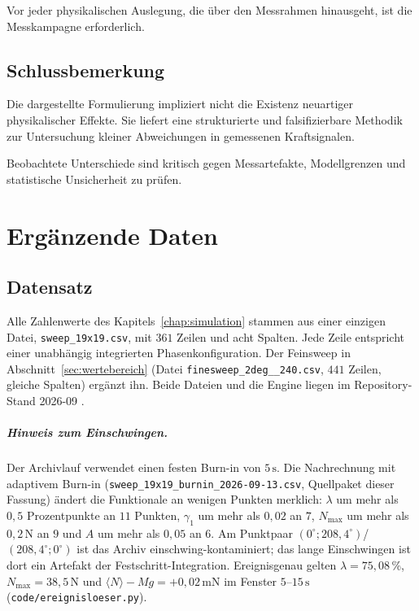 \documentclass[12pt,a4paper]{report}
\begin{document}
Vor jeder physikalischen Auslegung, die über den Messrahmen hinausgeht,
ist die Messkampagne erforderlich.

\section{Schlussbemerkung}

Die dargestellte Formulierung impliziert nicht die Existenz neuartiger
physikalischer Effekte. Sie liefert eine strukturierte und
falsifizierbare Methodik zur Untersuchung kleiner Abweichungen in
gemessenen Kraftsignalen.

Beobachtete Unterschiede sind kritisch gegen Messartefakte,
Modellgrenzen und statistische Unsicherheit zu prüfen.


\appendix

\chapter{Ergänzende Daten}
\label{app:daten}

\section{Datensatz}
\label{sec:anh-datensatz}

Alle Zahlenwerte des Kapitels~\ref{chap:simulation} stammen aus einer
einzigen Datei, \texttt{sweep\_19x19.csv}, mit $361$ Zeilen und acht
Spalten. Jede Zeile entspricht einer unabhängig integrierten
Phasenkonfiguration. Der Feinsweep in Abschnitt~\ref{sec:wertebereich}
(Datei \texttt{finesweep\_\allowbreak 2deg\_\_\allowbreak 240.csv}, $441$ Zeilen, gleiche
Spalten) ergänzt ihn. Beide Dateien und die Engine liegen im
Repository-Stand 2026-09 \cite{frueh2026repo}.

\paragraph{Hinweis zum Einschwingen.}
Der Archivlauf verwendet einen festen Burn-in von $5\,\mathrm{s}$. Die
Nachrechnung mit adaptivem Burn-in
(\texttt{sweep\_19x19\_burnin\_2026-09-13.csv}, Quellpaket dieser Fassung) ändert die Funktionale an wenigen Punkten merklich:
$\lambda$ um mehr als $0{,}5$ Prozentpunkte an $11$ Punkten, $\gamma_1$
um mehr als $0{,}02$ an $7$, $N_{\max}$ um mehr als $0{,}2\,\mathrm{N}$ an
$9$ und $A$ um mehr als $0{,}05$ an $6$. Am Punktpaar
$(0^\circ; 208{,}4^\circ)$/$(208{,}4^\circ; 0^\circ)$ ist das Archiv
einschwing-kontaminiert; das lange Einschwingen ist dort ein Artefakt der
Festschritt-Integration. Ereignisgenau gelten $\lambda = 75{,}08\,\%$,
$N_{\max} = 38{,}5\,\mathrm{N}$ und $\langle N\rangle - Mg =
+0{,}02\,\mathrm{mN}$ im Fenster $5$--$15\,\mathrm{s}$
(\texttt{code/ereignisloeser.py}).
\end{document}
